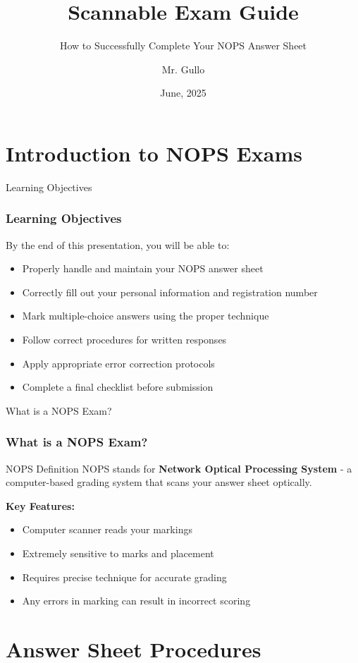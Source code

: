 \documentclass{beamer}
\title[NOPS Exam Guide]{Scannable Exam Guide}
\subtitle{How to Successfully Complete Your NOPS Answer Sheet}
\author[Mr. Gullo]{Mr. Gullo}
\date[June 2025]{June, 2025}
\begin{document}
\frame{\titlepage}

\section{Introduction to NOPS Exams}

\begin{frame}{Learning Objectives}
\frametitle{Learning Objectives}
By the end of this presentation, you will be able to:
\begin{itemize}
\item Properly handle and maintain your NOPS answer sheet
\item Correctly fill out your personal information and registration number
\item Mark multiple-choice answers using the proper technique
\item Follow correct procedures for written responses
\item Apply appropriate error correction protocols
\item Complete a final checklist before submission
\end{itemize}
\end{frame}

\begin{frame}{What is a NOPS Exam?}
\frametitle{What is a NOPS Exam?}
\begin{block}{NOPS Definition}
NOPS stands for \textbf{Network Optical Processing System} - a computer-based grading system that scans your answer sheet optically.
\end{block}

\textbf{Key Features:}
\begin{itemize}
\item Computer scanner reads your markings
\item Extremely sensitive to marks and placement
\item Requires precise technique for accurate grading
\item Any errors in marking can result in incorrect scoring
\end{itemize}

\end{frame}

\section{Answer Sheet Procedures}
\end{document}
